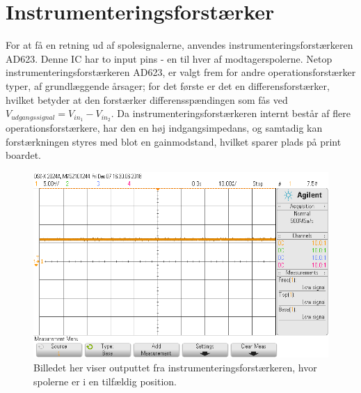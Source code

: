 \section{Instrumenteringsforstærker}\label{sec:summa}
For at få en retning ud af spolesignalerne, anvendes instrumenteringsforstærkeren AD623. Denne IC har to input pins - en til hver af modtagerspolerne.
Netop instrumenteringsforstærkeren AD623, er valgt frem for andre operationsforstærker typer, af grundlæggende årsager; for det første er det en differensforstærker, hvilket betyder at den forstærker differensspændingen som fås ved $V_{udgangssignal} = V_{in_1} - V_{in_2}$. Da instrumenteringsforstærkeren internt består af flere operationsforstærkere, har den en høj indgangsimpedans, og samtadig kan forstærkningen styres med blot en gainmodstand, hvilket sparer plads på print boardet.

\begin{figure}[h!]
	\centering
	\includegraphics[width=1\textwidth]{billeder/instr_png.png}
	\caption{Billedet her viser outputtet fra instrumenteringsforstærkeren, hvor spolerne er i en tilfældig position.}
	\label{fig:filter_out}
\end{figure}

